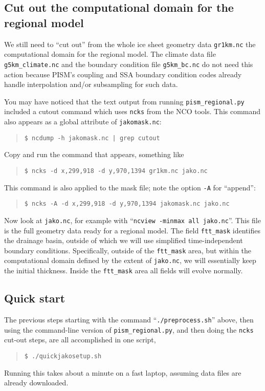 \subsection*{Cut out the computational domain for the regional model}
We still need to ``cut out'' from the whole ice sheet geometry data \verb|gr1km.nc| the computational domain for the regional model.  The climate data file \texttt{g5km_climate.nc} and the boundary condition file \texttt{g5km_bc.nc} do not need this action because PISM's coupling and SSA boundary condition codes already handle interpolation and/or subsampling for such data.

You may have noticed that the text output from running \texttt{pism_regional.py} included a cutout command which uses \texttt{ncks} from the NCO tools.  This command also appears as a global attribute of \texttt{jakomask.nc}:
\begin{quote}\small
\begin{verbatim}
$ ncdump -h jakomask.nc | grep cutout
\end{verbatim}
\normalsize\end{quote}
Copy and run the command that appears, something like
\begin{quote}\small
\begin{verbatim}
$ ncks -d x,299,918 -d y,970,1394 gr1km.nc jako.nc
\end{verbatim}
\normalsize\end{quote}
This command is also applied to the mask file; note the option \verb|-A| for ``append'':
\begin{quote}\small
\begin{verbatim}
$ ncks -A -d x,299,918 -d y,970,1394 jakomask.nc jako.nc
\end{verbatim}
\normalsize\end{quote}
Now look at \verb|jako.nc|, for example with ``\verb|ncview -minmax all jako.nc|''.  This file is the full geometry data ready for a regional model.  The field \verb|ftt_mask| identifies the drainage basin, outside of which we will use simplified time-independent boundary conditions.  Specifically, outside of the \verb|ftt_mask| area, but within the computational domain defined by the extent of \verb|jako.nc|, we will essentially keep the initial thickness.  Inside the \verb|ftt_mask| area all fields will evolve normally.

\subsection*{Quick start}
The previous steps starting with the command ``\verb|./preprocess.sh|'' above, then using the command-line version of \verb|pism_regional.py|, and then doing the \verb|ncks| cut-out steps, are all accomplished in one script,
\begin{quote}\small
\begin{verbatim}
$ ./quickjakosetup.sh
\end{verbatim}
\normalsize\end{quote}
Running this takes about a minute on a fast laptop, assuming data files are already downloaded.

